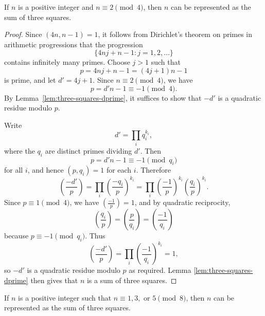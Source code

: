\begin{lemma}
\label{lem:n2mod4}
\leanok
If $n$ is a positive integer and $n\equiv 2 \pmod 4$, then $n$ can be
represented as the sum of three squares.
\end{lemma}

\begin{proof}
\leanok
Since $(4n,n-1)=1$, it follows from Dirichlet's theorem on primes in
arithmetic progressions that the progression
\[
\{4nj+n-1 : j=1,2,\dots\}
\]
contains infinitely many primes.  Choose $j>1$ such that
\[
p = 4nj + n - 1 = (4j+1)n - 1
\]
is prime, and let $d' = 4j+1$.  Since $n\equiv 2\pmod 4$, we have
\[
p = d'n - 1 \equiv -1 \pmod 4.
\]
By Lemma~\ref{lem:three-squares-dprime}, it suffices to show that $-d'$ is
a quadratic residue modulo $p$.

Write
\[
d' = \prod_i q_i^{k_i},
\]
where the $q_i$ are distinct primes dividing $d'$.  Then
\[
p = d'n - 1 \equiv -1 \pmod{q_i}
\]
for all $i$, and hence $(p,q_i)=1$ for each $i$.  Therefore
\[
\left(\frac{-d'}{p}\right)
 = \prod_i \left(\frac{-q_i}{p}\right)^{k_i}
 = \prod_i \left(\frac{-1}{p}\right)^{k_i}
         \left(\frac{q_i}{p}\right)^{k_i}.
\]
Since $p\equiv 1\pmod 4$, we have $\left(\frac{-1}{p}\right)=1$, and by
quadratic reciprocity,
\[
\left(\frac{q_i}{p}\right) = \left(\frac{p}{q_i}\right)
= \left(\frac{-1}{q_i}\right)
\]
because $p\equiv -1\pmod{q_i}$.  Thus
\[
\left(\frac{-d'}{p}\right)
 = \prod_i \left(\frac{-1}{q_i}\right)^{k_i}
 = 1,
\]
so $-d'$ is a quadratic residue modulo $p$ as required.  Lemma
\ref{lem:three-squares-dprime} then gives that $n$ is a sum of three
squares.
\end{proof}

\begin{lemma}
\label{lem:n135mod8}
\leanok
If $n$ is a positive integer such that $n\equiv 1,3,$ or $5 \pmod 8$, then
$n$ can be represented as the sum of three squares.
\end{lemma}

